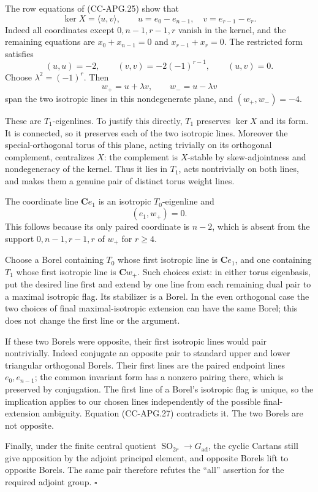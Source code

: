 The row equations of (CC-APG.25) show that \[
 \ker X=\langle u,v\rangle,\qquad
 u=e_0-e_{n-1},\quad v=e_{r-1}-e_r.
 \tag{CC-APG.26}
\] Indeed all coordinates except \(0,n-1,r-1,r\) vanish in the kernel,
and the remaining equations are \(x_0+x_{n-1}=0\) and \(x_{r-1}+x_r=0\).
The restricted form satisfies \[
 (u,u)=-2,\qquad
 (v,v)=-2(-1)^{r-1},\qquad(u,v)=0.
\] Choose \(\lambda^2=(-1)^r\). Then \[
 w_+=u+\lambda v,\qquad w_-=u-\lambda v
\] span the two isotropic lines in this nondegenerate plane, and
\((w_+,w_-)=-4\).

These are \(T_1\)-eigenlines. To justify this directly, \(T_1\)
preserves \(\ker X\) and its form. It is connected, so it preserves each
of the two isotropic lines. Moreover the special-orthogonal torus of
this plane, acting trivially on its orthogonal complement, centralizes
\(X\): the complement is \(X\)-stable by skew-adjointness and
nondegeneracy of the kernel. Thus it lies in \(T_1\), acts nontrivially
on both lines, and makes them a genuine pair of distinct torus weight
lines.

The coordinate line \(\mathbf Ce_1\) is an isotropic \(T_0\)-eigenline
and \[
 (e_1,w_+)=0.
 \tag{CC-APG.27}
\] This follows because its only paired coordinate is \(n-2\), which is
absent from the support \(0,n-1,r-1,r\) of \(w_+\) for \(r\geq4\).

Choose a Borel containing \(T_0\) whose first isotropic line is
\(\mathbf Ce_1\), and one containing \(T_1\) whose first isotropic line
is \(\mathbf Cw_+\). Such choices exist: in either torus eigenbasis, put
the desired line first and extend by one line from each remaining dual
pair to a maximal isotropic flag. Its stabilizer is a Borel. In the even
orthogonal case the two choices of final maximal-isotropic extension can
have the same Borel; this does not change the first line or the
argument.

If these two Borels were opposite, their first isotropic lines would
pair nontrivially. Indeed conjugate an opposite pair to standard upper
and lower triangular orthogonal Borels. Their first lines are the paired
endpoint lines \(e_0,e_{n-1}\); the common invariant form has a nonzero
pairing there, which is preserved by conjugation. The first line of a
Borel's isotropic flag is unique, so the implication applies to our
chosen lines independently of the possible final-extension ambiguity.
Equation (CC-APG.27) contradicts it. The two Borels are not opposite.

Finally, under the finite central quotient
\(\operatorname{SO}_{2r}\to G_{\mathrm{ad}}\), the cyclic Cartans still
give apposition by the adjoint principal element, and opposite Borels
lift to opposite Borels. The same pair therefore refutes the ``all''
assertion for the required adjoint group. \(\square\)

